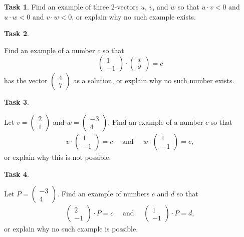 \documentclass[10pt,]{book}
\theoremstyle{plain}
\theoremstyle{definition}
\numberwithin{equation}{section}
\newtheorem{task}{Task}[chapter]
\begin{document}
\begin{task}
\label{task-16}
Find an example of three \(2\)-vectors \(u\), \(v\),
        and \(w\) so that \( u \cdot v < 0\) and \(u\cdot w < 0 \)
        and \(v \cdot w < 0\), or explain why no such example exists.
      \end{task}
\begin{task}
\label{task-17}

        Find an example of a number \(c\) so that \[
        \begin{pmatrix} 1 \\ -1 \end{pmatrix} \cdot \begin{pmatrix} x \\ y
          \end{pmatrix} = c
        \] has the vector \(\left(\begin{smallmatrix}4 \\ 7 \end{smallmatrix}\right)\)
        as a solution, or explain why no such number exists.
      \end{task}
\begin{task}
\label{task-18}

        Let \(v = \left(\begin{smallmatrix}2\\1\end{smallmatrix}\right)\) and
        \(w=\left(\begin{smallmatrix}-3\\4\end{smallmatrix}\right)\). Find
        an example of a number \(c\) so that \begin{gather*}
v \cdot \begin{pmatrix}1\\-1\end{pmatrix} = c \quad\text{ and }
        \quad w \cdot \begin{pmatrix}1\\-1\end{pmatrix} = c,
\end{gather*}
        or explain why this is not possible.
      \end{task}
\begin{task}
\label{task-19}

        Let \(P = \left(\begin{smallmatrix}-3\\4\end{smallmatrix}\right)\).
        Find an example of numbers \(c\) and \(d\) so that \begin{gather*}
\begin{pmatrix} 2\\-1\end{pmatrix}\cdot P = c \quad\text{ and }
        \quad \begin{pmatrix} 1\\-1\end{pmatrix}\cdot P = d,
\end{gather*}
        or explain why no such example is possible.
      \end{task}
\end{document}
